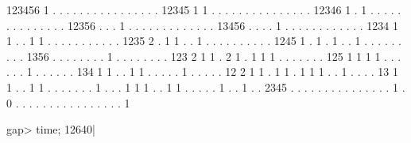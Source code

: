     123456   1  .  .  .  .  .  .  .  .  .  .  .  .  .  .  .  .
     12345   1  1  .  .  .  .  .  .  .  .  .  .  .  .  .  .  .
     12346   1  .  1  .  .  .  .  .  .  .  .  .  .  .  .  .  .
     12356   .  .  .  1  .  .  .  .  .  .  .  .  .  .  .  .  .
     13456   .  .  .  .  1  .  .  .  .  .  .  .  .  .  .  .  .
      1234   1  1  .  .  1  1  .  .  .  .  .  .  .  .  .  .  .
      1235   2  .  1  1  .  .  1  .  .  .  .  .  .  .  .  .  .
      1245   1  .  1  .  1  .  .  1  .  .  .  .  .  .  .  .  .
      1356   .  .  .  .  .  .  .  .  1  .  .  .  .  .  .  .  .
       123   2  1  1  .  2  1  .  1  1  1  .  .  .  .  .  .  .
       125   1  1  1  1  .  .  .  .  .  .  1  .  .  .  .  .  .
       134   1  1  .  .  1  1  .  .  .  .  .  1  .  .  .  .  .
        12   2  1  1  .  1  1  .  1  1  1  .  .  1  .  .  .  .
        13   1  1  .  .  1  1  .  .  .  .  .  .  .  1  .  .  .
         1   1  1  .  .  1  1  .  .  .  .  .  1  .  .  1  .  .
      2345   .  .  .  .  .  .  .  .  .  .  .  .  .  .  .  1  .
         0   .  .  .  .  .  .  .  .  .  .  .  .  .  .  .  .  1

    gap> time;
    12640|
